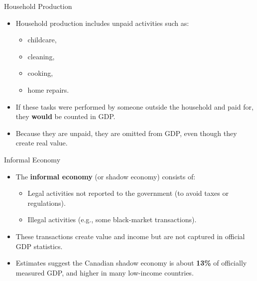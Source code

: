 \documentclass[aspectratio=169]{beamer}
\begin{document}
\begin{frame}{Household Production}
\transfade
\begin{itemize}
  \item Household production includes unpaid activities such as:
  \begin{itemize}
    \item childcare,
    \item cleaning,
    \item cooking,
    \item home repairs.
  \end{itemize}
  \item If these tasks were performed by someone outside the household and paid for, they \textbf{would} be counted in GDP.
  \item Because they are unpaid, they are \alert{omitted} from GDP, even though they create real value.
\end{itemize}
\end{frame}

\begin{frame}{Informal Economy}
\transfade
\begin{itemize}
  \item The \textbf{informal economy} (or shadow economy) consists of:
  \begin{itemize}
    \item Legal activities not reported to the government (to avoid taxes or regulations).
    \item Illegal activities (e.g., some black-market transactions).
  \end{itemize}
  \item These transactions create value and income but are not captured in official GDP statistics.
  \item Estimates suggest the Canadian shadow economy is about \textbf{13\%} of officially measured GDP, and higher in many low-income countries.
\end{itemize}
\end{frame}
\end{document}
